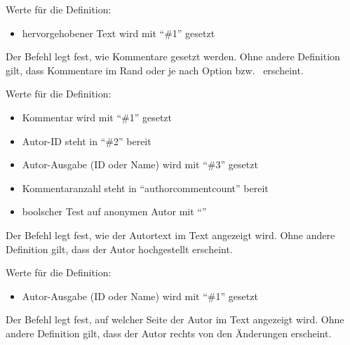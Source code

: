 Werte für die Definition:

\begin{itemize}
	\item hervorgehobener Text wird mit "`\#1"' gesetzt
\end{itemize}





Der Befehl  legt fest, wie Kommentare gesetzt werden.
Ohne andere Definition gilt, dass Kommentare im Rand oder je nach Option  bzw.\  erscheint.

Werte für die Definition:

\begin{itemize}
	\item Kommentar wird mit "`\#1"' gesetzt
	\item Autor-ID steht in "`\#2"' bereit
	\item Autor-Ausgabe (ID oder Name) wird mit "`\#3"' gesetzt
	\item Kommentaranzahl steht in "`authorcommentcount"' bereit
	\item boolscher Test auf anonymen Autor mit "`"'
\end{itemize}





Der Befehl  legt fest, wie der Autortext im Text angezeigt wird.
Ohne andere Definition gilt, dass der Autor hochgestellt erscheint.

Werte für die Definition:

\begin{itemize}
	\item Autor-Ausgabe (ID oder Name) wird mit "`\#1"' gesetzt
\end{itemize}





Der Befehl  legt fest, auf welcher Seite der Autor im Text angezeigt wird.
Ohne andere Definition gilt, dass der Autor rechts von den Änderungen erscheint.

